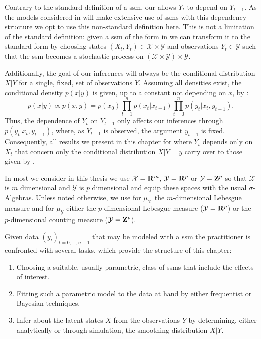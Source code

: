 \begin{remark}
    \label{rem:dependence_Yt-1}
    Contrary to the standard definition of a \gls{ssm}, our  allows $Y_t$ to depend on $Y_{t - 1}$.
    As the models considered in  will make extensive use of \glspl{ssm} with this dependency structure we opt to use this non-standard definition here.
    This is not a limitation of the standard definition: given a \gls{ssm} of the form in  we can transform it to the standard form by choosing states $(X_t, Y_t) \in \mathcal X \times \mathcal Y$ and observations $Y_t \in \mathcal Y$ such that the \gls{ssm} becomes a stochastic process on $ \left( \mathcal X \times \mathcal Y\right) \times \mathcal Y$.

    Additionally, the goal of our inferences will always be the conditional distribution $X|Y$ for a single, fixed, set of observations $Y$. Assuming all densities exist, the conditional density $p(x|y)$ is given, up to a constant not depending on $x$, by :
    $$
    p(x|y) \propto p(x,y) =p (x_0)\prod_{t = 1}^{n} p(x_{t}|x_{t - 1}) \prod_{t = 0}^{n} p(y_t | x_t, y_{t - 1}).
    $$
    Thus, the dependence of $Y_{t}$ on $Y_{t - 1}$ only affects our inferences through $p(y_{t} | x_{t}, y_{t - 1})$, where, as $Y_{t - 1}$ is observed, the argument $y_{t - 1}$ is fixed. 
    Consequently, all results we present in this chapter for  where $Y_{t}$ depends only on $X_{t}$ that concern only the conditional distribution $X|Y=y$ carry over to those given by . 

    In most  we consider in this thesis we use $\mathcal X = \mathbf R^m$, $\mathcal Y = \mathbf R^p$ or $\mathcal Y = \mathbf Z^p$ so that $\mathcal X$ is $m$ dimensional and $\mathcal Y$ is $p$ dimensional and equip these spaces with the usual $\sigma$-Algebras. Unless noted otherwise, we use for $\mu_{\mathcal X}$ the $m$-dimensional Lebesgue measure and for $\mu_{\mathcal Y}$ either the $p$-dimensional Lebesgue measure ($\mathcal Y = \mathbf R^{p}$) or the $p$-dimensional counting measure ($\mathcal Y = \mathbf Z^{p}$).
\end{remark}

Given data $(y_t)_{t = 0, \dots, n - 1}$ that may be modeled with a \gls{ssm} the practitioner is confronted with several tasks, which provide the structure of this chapter:

\begin{enumerate}
    \item\label{it:model_choice} Choosing a suitable, usually parametric, class of \glspl{ssm} that include the effects of interest.
    \item\label{it:model_fitting} Fitting such a parametric model to the data at hand by either frequentist or Bayesian techniques.
    \item\label{it:smoothing_problem} Infer about the latent states $X$ from the observations $Y$ by determining, either analytically or through simulation, the smoothing distribution $X|Y$.
\end{enumerate}

